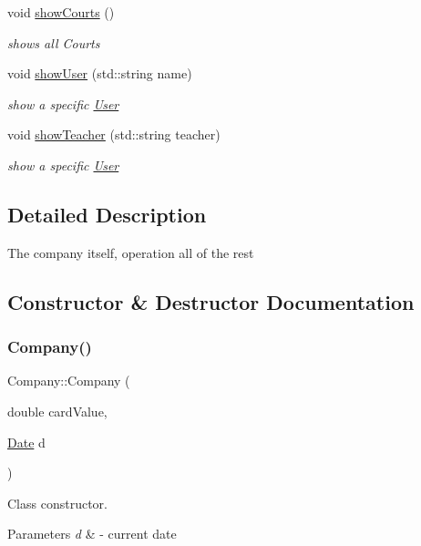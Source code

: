 \begin{DoxyCompactItemize}
$$void \mbox{\hyperlink{class_company_a1779c78bdc9a4416a482be25b71efcd0}{show\+Courts}} ()
\begin{DoxyCompactList}\small\item\em shows all Courts \end{DoxyCompactList}\item 
void \mbox{\hyperlink{class_company_a664aa9b9bde35eae3a564edec73cf5b3}{show\+User}} (std\+::string name)
\begin{DoxyCompactList}\small\item\em show a specific \mbox{\hyperlink{class_user}{User}} \end{DoxyCompactList}\item 
void \mbox{\hyperlink{class_company_aa64ff74648761cfe39d4a9fb0c72031f}{show\+Teacher}} (std\+::string teacher)
\begin{DoxyCompactList}\small\item\em show a specific \mbox{\hyperlink{class_user}{User}} \end{DoxyCompactList}\end{DoxyCompactItemize}


\subsection{Detailed Description}
The company itself, operation all of the rest 

\subsection{Constructor \& Destructor Documentation}
\mbox{\label{class_company_ac038a4c5e02f13a7bab9b5139990316e}} 
\subsubsection{\texorpdfstring{Company()}{Company()}}
{\footnotesize\ttfamily Company\+::\+Company (\begin{DoxyParamCaption}\item[{double}]{card\+Value,  }\item[{\mbox{\hyperlink{class_date}{Date}}}]{d }\end{DoxyParamCaption})}



Class constructor. 


\begin{DoxyParams}{Parameters}
{\em d} & -\/ current date \\
\hline
\end{DoxyParams}


